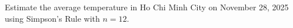 \documentclass[preview]{standalone}
\begin{document}
\begin{center}
Estimate the average temperature in Ho Chi Minh City on November 28, 2025\\using Simpson's Rule with $n=12$.
\end{center}
\end{document}
